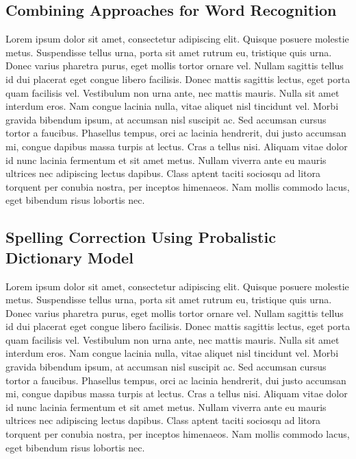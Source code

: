 \documentclass[12pt]{article}
\begin{document}
	\subsection{Combining Approaches for Word Recognition}
	\label{subsection:combined}
	Lorem ipsum dolor sit amet, consectetur adipiscing elit. Quisque posuere molestie metus. Suspendisse tellus urna, porta sit amet rutrum eu, tristique quis urna. Donec varius pharetra purus, eget mollis tortor ornare vel. Nullam sagittis tellus id dui placerat eget congue libero facilisis. Donec mattis sagittis lectus, eget porta quam facilisis vel. Vestibulum non urna ante, nec mattis mauris. Nulla sit amet interdum eros. Nam congue lacinia nulla, vitae aliquet nisl tincidunt vel. Morbi gravida bibendum ipsum, at accumsan nisl suscipit ac. Sed accumsan cursus tortor a faucibus. Phasellus tempus, orci ac lacinia hendrerit, dui justo accumsan mi, congue dapibus massa turpis at lectus. Cras a tellus nisi. Aliquam vitae dolor id nunc lacinia fermentum et sit amet metus. Nullam viverra ante eu mauris ultrices nec adipiscing lectus dapibus. Class aptent taciti sociosqu ad litora torquent per conubia nostra, per inceptos himenaeos. Nam mollis commodo lacus, eget bibendum risus lobortis nec.

	\subsection{Spelling Correction Using Probalistic Dictionary Model}
	\label{subsection:spellingcheck}
	Lorem ipsum dolor sit amet, consectetur adipiscing elit. Quisque posuere molestie metus. Suspendisse tellus urna, porta sit amet rutrum eu, tristique quis urna. Donec varius pharetra purus, eget mollis tortor ornare vel. Nullam sagittis tellus id dui placerat eget congue libero facilisis. Donec mattis sagittis lectus, eget porta quam facilisis vel. Vestibulum non urna ante, nec mattis mauris. Nulla sit amet interdum eros. Nam congue lacinia nulla, vitae aliquet nisl tincidunt vel. Morbi gravida bibendum ipsum, at accumsan nisl suscipit ac. Sed accumsan cursus tortor a faucibus. Phasellus tempus, orci ac lacinia hendrerit, dui justo accumsan mi, congue dapibus massa turpis at lectus. Cras a tellus nisi. Aliquam vitae dolor id nunc lacinia fermentum et sit amet metus. Nullam viverra ante eu mauris ultrices nec adipiscing lectus dapibus. Class aptent taciti sociosqu ad litora torquent per conubia nostra, per inceptos himenaeos. Nam mollis commodo lacus, eget bibendum risus lobortis nec.
	
	
\end{document}
